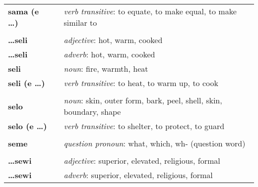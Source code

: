 \begin{supertabular}{p{2,5cm}|ll}
    \textbf{sama (e \dots)}      &  & \textit{verb transitive}: to equate, to make equal, to make similar to                                     \\
                                 &  &                                                                                                            \\ %
    \textbf{\dots seli}          &  & \textit{adjective}: hot, warm, cooked                                                                      \\
    \textbf{\dots seli}          &  & \textit{adverb}: hot, warm, cooked                                                                         \\
    \textbf{seli}                &  & \textit{noun}: fire, warmth, heat                                                                          \\
    \textbf{seli (e \dots)}      &  & \textit{verb transitive}: to heat, to warm up, to cook                                                     \\
                                 &  &                                                                                                            \\ %
    \textbf{selo}                &  & \textit{noun}: skin, outer form, bark, peel, shell, skin, boundary, shape                                  \\
    \textbf{selo (e \dots)}      &  & \textit{verb transitive}: to shelter, to protect, to guard                                                 \\
                                 &  &                                                                                                            \\ %
    \textbf{seme}                &  & \textit{question pronoun}: what, which, wh- (question word)                                                \\
                                 &  &                                                                                                            \\ %
    \textbf{\dots sewi}          &  & \textit{adjective}: superior, elevated, religious, formal                                                  \\
    \textbf{\dots sewi}          &  & \textit{adverb}: superior, elevated, religious, formal                                                     \\

\end{supertabular}
